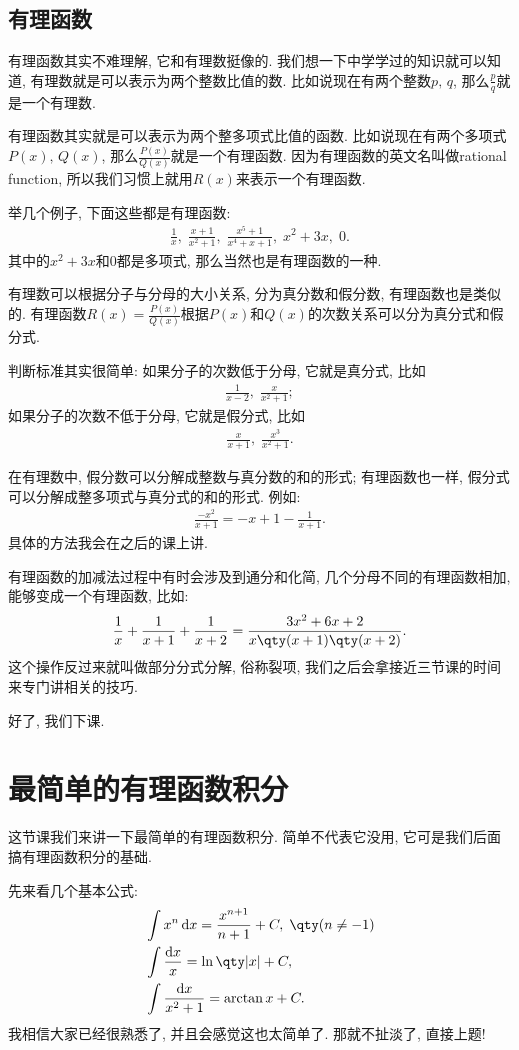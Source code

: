 \documentclass{ctexbook}
\newcommand*{\dif}{\mathop{}\!\mathrm{d}}
\begin{document}
{\subsection{有理函数}
有理函数其实不难理解, 它和有理数挺像的. 我们想一下中学学过的知识就可以知道, 有理数就是可以表示为两个整数比值的数. 比如说现在有两个整数$p,\,q$, 那么$\frac{p}{q}$就是一个有理数. \par
有理函数其实就是可以表示为两个整多项式比值的函数. 比如说现在有两个多项式$P(x),\,Q(x)$, 那么$\frac{P(x)}{Q(x)}$就是一个有理函数. 因为有理函数的英文名叫做rational function, 所以我们习惯上就用$R(x)$来表示一个有理函数. \par
举几个例子, 下面这些都是有理函数: 
\begin{align*}
\frac{1}{x},\;\frac{x+1}{x^{2}+1},\;\frac{x^{5}+1}{x^{4}+x+1},\;x^{2}+3x,\;0
.\end{align*}
其中的$x^{2}+3x$和$0$都是多项式, 那么当然也是有理函数的一种. \par
有理数可以根据分子与分母的大小关系, 分为真分数和假分数, 有理函数也是类似的. 有理函数$R(x)=\frac{P(x)}{Q(x)}$根据$P(x)$和$Q(x)$的次数关系可以分为真分式和假分式. \par
判断标准其实很简单: 如果分子的次数低于分母, 它就是真分式, 比如
\begin{align*}
\frac{1}{x-2},\;\frac{x}{x^{2}+1}
;\end{align*}
如果分子的次数不低于分母, 它就是假分式, 比如
\begin{align*}
\frac{x}{x+1},\;\frac{x^{3}}{x^{2}+1}
.\end{align*}\par
在有理数中, 假分数可以分解成整数与真分数的和的形式; 有理函数也一样, 假分式可以分解成整多项式与真分式的和的形式. 例如: 
\begin{align*}
\frac{-x^{2}}{x+1}=-x+1-\frac{1}{x+1}
.\end{align*}
具体的方法我会在之后的课上讲. \par
有理函数的加减法过程中有时会涉及到通分和化简, 几个分母不同的有理函数相加, 能够变成一个有理函数, 比如: 
\begin{align*}
\frac{1}{x}+\frac{1}{x+1}+\frac{1}{x+2}=\frac{3x^{2}+6x+2}{x\qty(x+1)\qty(x+2)}
.\end{align*}
这个操作反过来就叫做部分分式分解, 俗称裂项, 我们之后会拿接近三节课的时间来专门讲相关的技巧. \par
好了, 我们下课. \par
\section{最简单的有理函数积分}
这节课我们来讲一下最简单的有理函数积分. 简单不代表它没用, 它可是我们后面搞有理函数积分的基础. \par
先来看几个基本公式: 
\begin{align*}
{}&\int x^{n}\dif{x}=\frac{x^{n+1}}{n+1}+C,\;\qty(n\ne-1)\\
{}&\int\frac{\dif{x}}{x}=\ln\qty|x|+C,\\
{}&\int\frac{\dif{x}}{x^{2}+1}=\arctan{x}+C
.\end{align*}
我相信大家已经很熟悉了, 并且会感觉这也太简单了. 那就不扯淡了, 直接上题! \par
}
\end{document}
